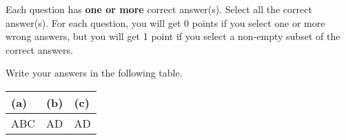 
Each question has \textbf{one or more} correct answer(s). Select all the correct answer(s). For each question, you will get 0 points if you select one or more wrong answers, but you will get 1 point if you select a non-empty subset of the correct answers.

Write your answers in the following table.


\begin{table}[htbp]
    \centering
    \begin{tabular}{|p{2cm}|p{2cm}|p{2cm}|}
        \hline
        (a) & (b) & (c) \\
        \hline
        ABC & AD & AD  \\
        \hline
    \end{tabular}\label{tab:multiple}
\end{table}

